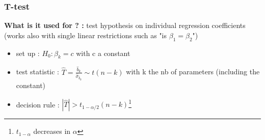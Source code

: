 \documentclass{article}
\begin{document}
\subsubsection{T-test}
\begin{Tbox}
    \textbf{What is it used for ? :} test hypothesis on individual regression coefficients (works also with single linear restrictions such as "is $\beta_1=\beta_2$")
    \begin{itemize}
        \item set up : $H_0 : \beta_k = c$ with c a constant
        \item test statistic : $\hat{T} = \frac{\hat{b}_k}{\hat{\sigma}_{\hat{b}_k}} \sim t(n-k)$ with k the nb of parameters (including the constant)
        \item decision rule : $|\hat{T}|>t_{1-\alpha/2}(n-k)$\footnote{$t_{1-\alpha}$ decreases in $\alpha$}
    \end{itemize}
\end{Tbox}
\end{document}
